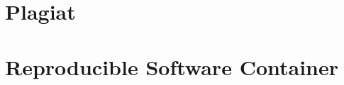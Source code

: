 \section{Plagiat}\label{plagiat}

\section{Reproducible Software
Container}\label{reproducible-software-container}
